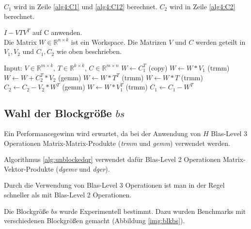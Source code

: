 $C_1$ wird in Zeile \ref{alg4:C1} und \ref{alg4:C12} berechnet. $C_2$ wird in Zeile \ref{alg4:C2} berechnet.



\begin{algorithm}[H]
	\caption{$I - V T V^T$ auf C anwenden.\\
			 Die Matrix $W \in \mathbb{R}^{n \times k}$ ist ein Workspace. Die Matrizen $V$ und $C$ werden geteilt in $V_1, V_2$ und $C_1,C_2$ wie oben beschrieben.}
	\label{alg:applyblockref}
	\begin{algorithmic}[1]
		\State Input: $V \in \mathbb{R}^{m \times k}$, $T \in \mathbb{R}^{k \times k}$, $C \in \mathbb{R}^{m \times n}$
		\State 	$W \leftarrow C_1^T$ (copy) \label{alg4:beg}
		\State	$W \leftarrow W * V_1 $ (trmm)
			\State $W \leftarrow W + C_2^T*V_2$ (gemm)
		\EndIf \label{alg4:end}
		 \label{alg4:trans}
			\State 	$ W \leftarrow W * T^T$ (trmm)
		\Else
			\State 	$  W \leftarrow W * T$ (trmm)
		\EndIf \label{alg4:transE}
			\State $C_2 \leftarrow C_2 - V_2 * W^T$ (gemm) \label{alg4:C2}
		\EndIf
		\State 	$ W \leftarrow W * V_1^T $ (trmm) \label{alg4:C1}
		\State 	$ C_1 \leftarrow C_1 - W^T $ \label{alg4:C12}
	\end{algorithmic}
\end{algorithm}


\subsection{Wahl der Blockgröße $bs$} \label{bs}


Ein Performancegewinn wird erwartet, da bei der Anwendung von $H$  Blas-Level 3 Operationen Matrix-Matrix-Produkte (\textit{trmm} und \textit{gemm}) verwendet werden. 

Algorithmus \ref{alg:unblockedqr} verwendet dafür Blas-Level 2 Operationen Matrix-Vektor-Produkte (\textit{dgemv} und \textit{dger}).

Durch die Verwendung von Blas-Level 3 Operationen ist man in der Regel schneller als mit Blas-Level 2 Operationen.


Die Blockgröße $bs$ wurde Experimentell bestimmt. Dazu wurden Benchmarks mit verschiedenen Blockgrößen gemacht (Abbildung \ref{img:blkbs}).





